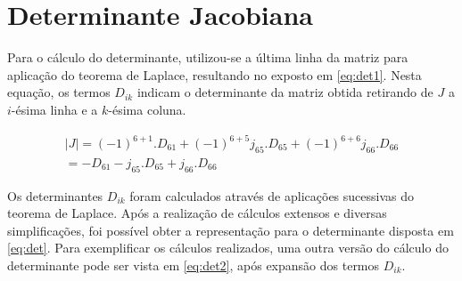 \section{Determinante Jacobiana}
\label{AnexoJacobiana-SecDeterminante}

Para o cálculo do determinante, utilizou-se a última linha da matriz para aplicação
do teorema de Laplace, resultando no exposto em \ref{eq:det1}. Nesta equação, os termos
$D_{ik}$ indicam o determinante da matriz obtida retirando de $J$ a $i$-ésima linha e a 
$k$-ésima coluna.

\begin{equation}
\label{eq:det1}
\begin{gathered}
    |J| = (-1)^{6+1}.D_{61} + (-1)^{6+5}j_{65}.D_{65} + (-1)^{6+6}j_{66}.D_{66} \\
    = -D_{61} - j_{65}.D_{65} + j_{66}.D_{66}
\end{gathered}
\end{equation}

Os determinantes $D_{ik}$ foram calculados através de aplicações sucessivas
do teorema de Laplace. Após a realização de cálculos extensos e diversas simplificações,
foi possível obter a representação para o determinante disposta em \ref{eq:det}.
Para exemplificar os cálculos realizados, uma outra versão do cálculo do determinante
pode ser vista em \ref{eq:det2}, após expansão dos termos $D_{ik}$.

\vspace{-1em}

